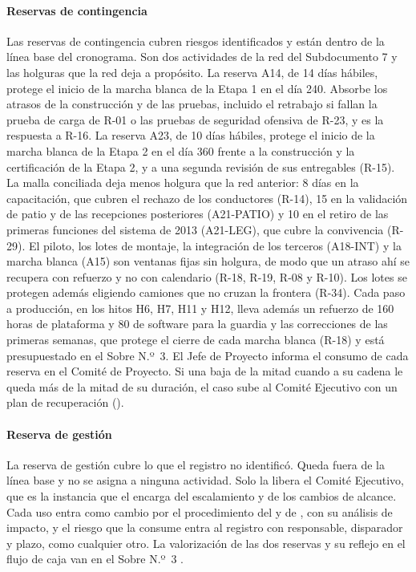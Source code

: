 \paragraph{Reservas de contingencia}
Las reservas de contingencia cubren riesgos identificados y están dentro de la línea base del
cronograma. Son dos actividades de la red del Subdocumento 7 y las holguras que la red deja a propósito.
La reserva A14, de 14 días hábiles, protege el inicio de la marcha blanca de la Etapa 1 en el día 240.
Absorbe los atrasos de la construcción y de las pruebas, incluido el retrabajo si fallan la prueba de
carga de R-01 o las pruebas de seguridad ofensiva de R-23, y es la respuesta a R-16. La reserva A23, de
10 días hábiles, protege el inicio de la marcha blanca de la Etapa 2 en el día 360 frente a la
construcción y la certificación de la Etapa 2, y a una segunda revisión de sus entregables (R-15). La
malla conciliada deja menos holgura que la red anterior: 8 días en la capacitación, que cubren el
rechazo de los conductores (R-14), 15 en la validación de patio y de las recepciones posteriores
(A21-PATIO) y 10 en el retiro de las primeras funciones del sistema de 2013 (A21-LEG), que cubre la
convivencia (R-29). El piloto, los lotes de montaje, la integración de los terceros (A18-INT) y la marcha
blanca (A15) son ventanas fijas sin holgura, de modo que un atraso ahí se recupera con refuerzo y no con
calendario (R-18, R-19, R-08 y R-10). Los lotes se protegen además eligiendo camiones que no cruzan la
frontera (R-34). Cada paso a producción, en los
hitos H6, H7, H11 y H12, lleva además un refuerzo de 160 horas de plataforma y 80 de software para la
guardia y las correcciones de las primeras semanas, que protege el cierre de cada marcha blanca (R-18)
y está presupuestado en el Sobre N.º~3. El Jefe de Proyecto informa el
consumo de cada reserva en el Comité de Proyecto. Si una baja de la mitad cuando a su cadena le queda más
de la mitad de su duración, el caso sube al Comité Ejecutivo con un plan de recuperación
().

\paragraph{Reserva de gestión}
La reserva de gestión cubre lo que el registro no identificó. Queda fuera de la línea base y no se asigna
a ninguna actividad. Solo la libera el Comité Ejecutivo, que es la instancia que el  encarga
del escalamiento y de los cambios de alcance. Cada uso entra como cambio por el procedimiento del
 y de , con su análisis de impacto, y el riesgo que la consume entra al
registro con responsable, disparador y plazo, como cualquier otro. La valorización de las dos reservas y
su reflejo en el flujo de caja van en el Sobre N.º~3 .
